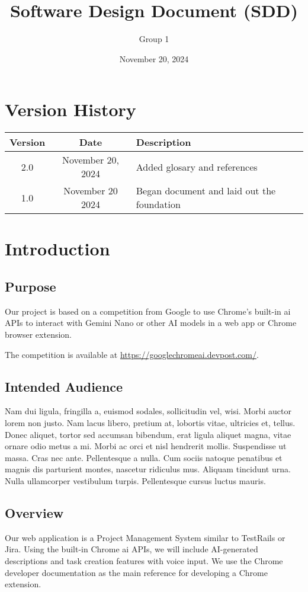 \documentclass{article}
\title{Software Design Document (SDD)}
\author{Group 1}
\date{November 20, 2024}
\begin{document}
\maketitle
\pagebreak

\tableofcontents
\pagebreak

\section*{Version History}
\begin{longtable}{|c|c|p{10cm}|}
\hline
\textbf{Version} & \textbf{Date} & \textbf{Description} \\ \hline
2.0 &November 20, 2024 & Added glosary and references \\ \hline
1.0 & November 20 2024 & Began document and laid out the foundation \\ \hline
\end{longtable}
\pagebreak

\section{Introduction}
\subsection{Purpose}
Our project is based on a competition from Google to use Chrome’s built-in \gls{ai} APIs to interact with Gemini Nano or other AI models in a web app or Chrome browser extension. 

The competition is available at \url{https://googlechromeai.devpost.com/}.

\subsection{Intended Audience}
Nam dui ligula, fringilla a, euismod sodales, sollicitudin vel, wisi. Morbi auctor lorem non justo. Nam lacus libero, pretium at, lobortis vitae, ultricies et, tellus. Donec aliquet, tortor sed accumsan bibendum, erat ligula aliquet magna, vitae ornare odio metus a mi. Morbi ac orci et nisl hendrerit mollis. Suspendisse ut massa. Cras nec ante. Pellentesque a nulla. Cum sociis natoque penatibus et magnis dis parturient montes, nascetur ridiculus mus. Aliquam tincidunt urna. Nulla ullamcorper vestibulum turpis. Pellentesque cursus luctus mauris.

\subsection{Overview}
Our web application is a Project Management System similar to TestRails or Jira. Using the built-in Chrome \gls{ai} APIs, we will include AI-generated descriptions and task creation features with voice input. We use the Chrome developer documentation \cite{chrome_dev} as the main reference for developing a Chrome extension.
\end{document}
